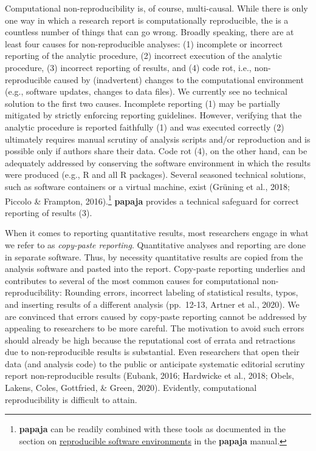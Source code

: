 \documentclass[
  ,man,floatsintext]{apa6}
\begin{document}
Computational non-reproducibility is, of course, multi-causal.
While there is only one way in which a research report is computationally reproducible, the is a countless number of things that can go wrong.
Broadly speaking, there are at least four causes for non-reproducible analyses: (1) incomplete or incorrect reporting of the analytic procedure, (2) incorrect execution of the analytic procedure, (3) incorrect reporting of results, and (4) code rot, i.e., non-reproducible caused by (inadvertent) changes to the computational environment (e.g., software updates, changes to data files).
We currently see no technical solution to the first two causes.
Incomplete reporting (1) may be partially mitigated by strictly enforcing reporting guidelines.
However, verifying that the analytic procedure is reported faithfully (1) and was executed correctly (2) ultimately requires manual scrutiny of analysis scripts and/or reproduction and is possible only if authors share their data.
Code rot (4), on the other hand, can be adequately addressed by conserving the software environment in which the results were produced (e.g., R and all R packages).
Several seasoned technical solutions, such as software containers or a virtual machine, exist (Grüning et al., 2018; Piccolo \& Frampton, 2016).\footnote{\textbf{papaja} can be readily combined with these tools as documented in the section on \href{http://frederikaust.com/papaja_man/tips-and-tricks.html\#reproducible-software-environments}{reproducible software environments} in the \textbf{papaja} manual.}
\textbf{papaja} provides a technical safeguard for correct reporting of results (3).

When it comes to reporting quantitative results, most researchers engage in what we refer to as \emph{copy-paste reporting}.
Quantitative analyses and reporting are done in separate software.
Thus, by necessity quantitative results are copied from the analysis software and pasted into the report.
Copy-paste reporting underlies and contributes to several of the most common causes for computational non-reproducibility: Rounding errors, incorrect labeling of statistical results, typos, and inserting results of a different analysis (pp.~12-13, Artner et al., 2020).
We are convinced that errors caused by copy-paste reporting cannot be addressed by appealing to researchers to be more careful.
The motivation to avoid such errors should already be high because the reputational cost of errata and retractions due to non-reproducible results is substantial.
Even researchers that open their data (and analysis code) to the public or anticipate systematic editorial scrutiny report non-reproducible results (Eubank, 2016; Hardwicke et al., 2018; Obels, Lakens, Coles, Gottfried, \& Green, 2020).
Evidently, computational reproducibility is difficult to attain.
\end{document}

